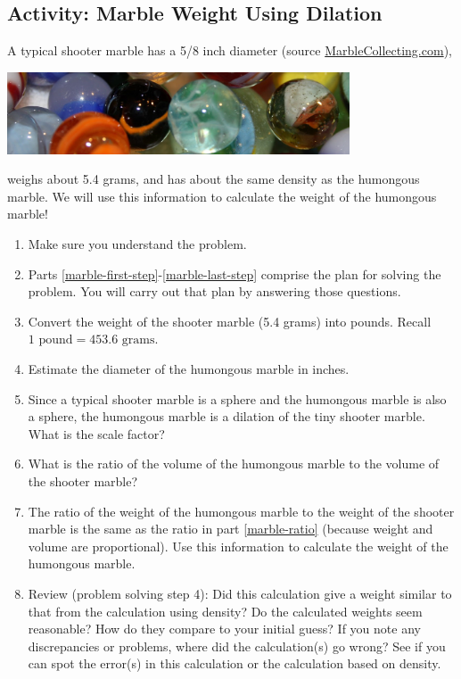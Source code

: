 \subsection{Activity: Marble Weight Using Dilation}
A typical shooter marble has a 5/8 inch diameter (source  \href{https://www.marblecollecting.com/marble-reference/how-to-size-marbles/}{MarbleCollecting.com}),
\begin{center}\includegraphics[width=4in]{images/marbles}\end{center}
weighs about 5.4 grams, and has about the same density as the humongous marble. We will use this information to calculate the weight of the humongous marble!
\begin{enumerate}
    \item Make sure you understand the problem.
    \item Parts \ref{marble-first-step}-\ref{marble-last-step} comprise the plan for solving the problem. You will carry out that plan by answering those questions.
    \item \label{marble-first-step}Convert the weight of the shooter marble (5.4 grams) into pounds. Recall $1\text{ pound}=453.6\text{ grams}$.\wbvfill
    \item Estimate the diameter of the humongous marble in inches.\wbvfill
    \item Since a typical shooter marble is a sphere and the humongous marble is also a sphere, the humongous marble is a dilation of the tiny shooter marble. What is the scale factor?\wbvfill
    \item \label{marble-ratio}What is the ratio of the volume of the humongous marble to the volume of the shooter marble?\wbvfill
    \item \label{marble-last-step}The ratio of the weight of the humongous marble to the weight of the shooter marble is the same as the ratio in part \ref{marble-ratio} (because weight and volume are proportional). Use this information to calculate the weight of the humongous marble.\wbvfill
    \item Review (problem solving step 4): Did this calculation give a weight similar to that from the calculation using density? Do the calculated weights seem reasonable? How do they compare to your initial guess? If you note any discrepancies or problems, where did the calculation(s) go wrong? See if you can spot the error(s) in this calculation or the calculation based on density.
\end{enumerate}

